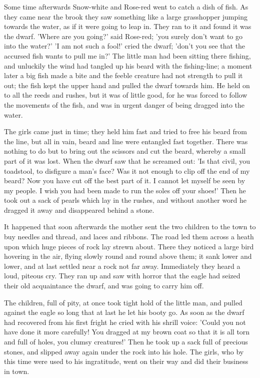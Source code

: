 \documentclass[12pt]{book}
\begin{document}
Some time afterwards Snow-white and Rose-red went to catch a dish of
fish. As they came near the brook they saw something like a large
grasshopper jumping towards the water, as if it were going to leap in.
They ran to it and found it was the dwarf. 'Where are you going?' said
Rose-red; 'you surely don't want to go into the water?' 'I am not such
a fool!' cried the dwarf; 'don't you see that the accursed fish wants
to pull me in?' The little man had been sitting there fishing, and
unluckily the wind had tangled up his beard with the fishing-line; a
moment later a big fish made a bite and the feeble creature had not
strength to pull it out; the fish kept the upper hand and pulled the
dwarf towards him. He held on to all the reeds and rushes, but it was
of little good, for he was forced to follow the movements of the fish,
and was in urgent danger of being dragged into the water.

The girls came just in time; they held him fast and tried to free his
beard from the line, but all in vain, beard and line were entangled
fast together. There was nothing to do but to bring out the scissors
and cut the beard, whereby a small part of it was lost. When the dwarf
saw that he screamed out: 'Is that civil, you toadstool, to disfigure
a man's face? Was it not enough to clip off the end of my beard? Now
you have cut off the best part of it. I cannot let myself be seen by
my people. I wish you had been made to run the soles off your shoes!'
Then he took out a sack of pearls which lay in the rushes, and without
another word he dragged it away and disappeared behind a stone.

It happened that soon afterwards the mother sent the two children to
the town to buy needles and thread, and laces and ribbons. The road
led them across a heath upon which huge pieces of rock lay strewn
about. There they noticed a large bird hovering in the air, flying
slowly round and round above them; it sank lower and lower, and at
last settled near a rock not far away. Immediately they heard a loud,
piteous cry. They ran up and saw with horror that the eagle had seized
their old acquaintance the dwarf, and was going to carry him off.

The children, full of pity, at once took tight hold of the little man,
and pulled against the eagle so long that at last he let his booty go.
As soon as the dwarf had recovered from his first fright he cried with
his shrill voice: 'Could you not have done it more carefully! You
dragged at my brown coat so that it is all torn and full of holes, you
clumsy creatures!' Then he took up a sack full of precious stones, and
slipped away again under the rock into his hole. The girls, who by
this time were used to his ingratitude, went on their way and did
their business in town.
\end{document}
